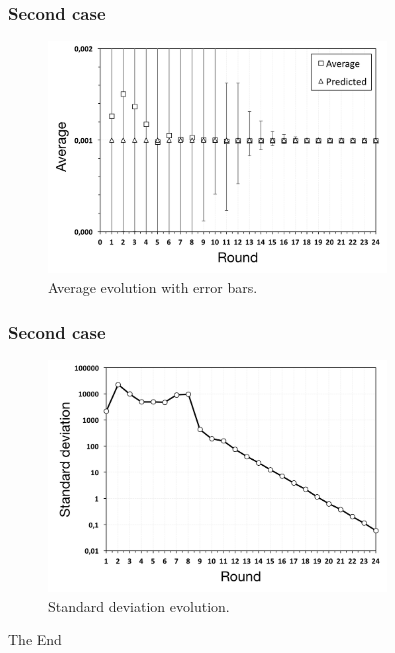 \documentclass{beamer}
\begin{document}
\begin{frame}
\frametitle{Second case}

\begin{figure}[p]
\centering
\includegraphics[keepaspectratio=true, width=0.8\textwidth]{images/counting_average}
\caption{Average evolution with error bars.}
\label{fig:counting_average}
\end{figure}

\end{frame}


\begin{frame}
\frametitle{Second case}
    
\begin{figure}[p]
\centering
\includegraphics[keepaspectratio=true, width=0.8\textwidth]{images/counting_standard_deviation}
\caption{Standard deviation evolution.}
\label{fig:counting_standard_deviation}
\end{figure}

\end{frame}

\begin{frame}
\Huge{\centerline{The End}}
\end{frame}

\end{document}
